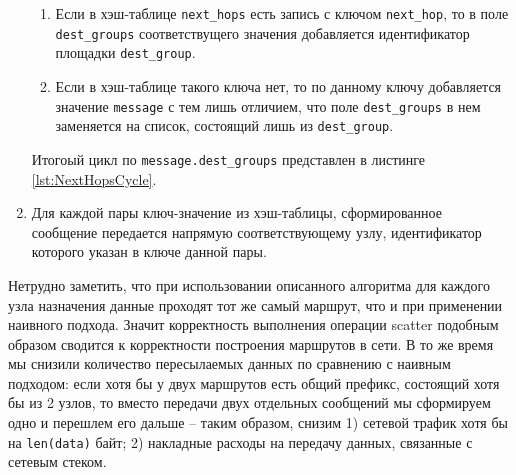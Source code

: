 \documentclass{article}
\theoremstyle{plain}
\theoremstyle{plain}
\theoremstyle{plain}
\theoremstyle{plain}
\theoremstyle{definition}
\theoremstyle{remark}
\theoremstyle{plain}
\begin{document}
\begin{enumerate}
\begin{enumerate}
        \item Если в хэш-таблице \texttt{next\_hops} есть запись с ключом \texttt{next\_hop}, то в поле \texttt{dest\_groups} соответствущего значения добавляется идентификатор площадки \texttt{dest\_group}.
        
        \item Если в хэш-таблице такого ключа нет, то по данному ключу добавляется значение \texttt{message} с тем лишь отличием, что поле \texttt{dest\_groups} в нем заменяется на список, состоящий лишь из \texttt{dest\_group}.
    \end{enumerate}
    
    Итогоый цикл по \texttt{message.dest\_groups} представлен в листинге \ref{lst:NextHopsCycle}.
    
        
    \item Для каждой пары ключ-значение из хэш-таблицы, сформированное сообщение передается напрямую соответствующему узлу, идентификатор которого указан в ключе данной пары.
\end{enumerate}

Нетрудно заметить, что при использовании описанного алгоритма для каждого узла назначения данные проходят тот же самый маршрут, что и при применении наивного подхода. Значит корректность выполнения операции scatter подобным образом сводится к корректности построения маршрутов в сети. В то же время мы снизили количество пересылаемых данных по сравнению с наивным подходом: если хотя бы у двух маршрутов есть общий префикс, состоящий хотя бы из 2 узлов, то вместо передачи двух отдельных сообщений мы сформируем одно и перешлем его дальше -- таким образом, снизим 1) сетевой трафик хотя бы на \texttt{len(data)} байт; 2) накладные расходы на передачу данных, связанные с сетевым стеком.
\end{document}
